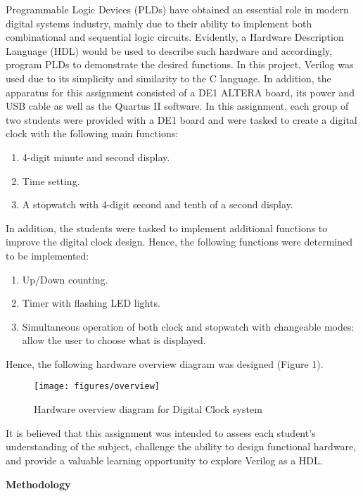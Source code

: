 \documentclass[12pt,a4paper]{article}
\begin{document}
	\noindent Programmable Logic Devices (PLDs) have obtained an essential role in modern digital systems industry, mainly due to their ability to implement both combinational and sequential logic circuits. Evidently, a Hardware Description Language (HDL) would be used to describe such hardware and accordingly, program PLDs to demonstrate the desired functions. In this project, Verilog was used due to its simplicity and similarity to the C language. In addition, the apparatus for this assignment consisted of a DE1 ALTERA board, its power and USB cable as well as the Quartus II software.
	In this assignment, each group of two students were provided with a DE1 board and were tasked to create a digital clock with the following main functions:
	\begin{enumerate}
		\item 4-digit minute and second display.
		\item Time setting.
		\item A stopwatch with 4-digit second and tenth of a second display.
	\end{enumerate}
	In addition, the students were tasked to implement additional functions to improve the digital clock design. Hence, the following functions were determined to be implemented:
	\begin{enumerate}
		\item Up/Down counting.
		\item Timer with flashing LED lights.
		\item Simultaneous operation of both clock and stopwatch with changeable modes: allow the user to choose what is displayed.
	\end{enumerate}

	\noindent Hence, the following hardware overview diagram was designed (Figure 1).
	
	\begin{figure}[H]
		\centering
		\texttt{[image: figures/overview]}
		\caption{Hardware overview diagram for Digital Clock system}
	\end{figure}

	\noindent It is believed that this assignment was intended to assess each student's understanding of the subject, challenge the ability to design functional hardware, and provide a valuable learning opportunity to explore Verilog as a HDL.
	
	\vspace{1cm}
	
	\noindent \textbf{\Large Methodology}
	\vspace{0.2cm}
	
\end{document}
